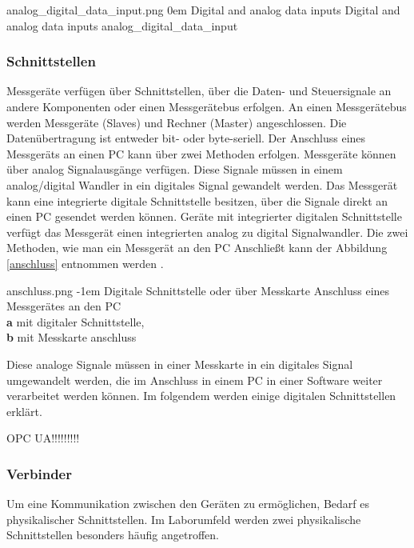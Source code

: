 {analog_digital_data_input.png}
{0em}
{Digital and analog data inputs \cite{hughes2010real}}
{Digital and analog data inputs \cite{hughes2010real}}
{analog_digital_data_input}



\subsubsection{Schnittstellen}

Messgeräte verfügen über Schnittstellen, über die Daten- und Steuersignale an andere Komponenten oder einen Messgerätebus erfolgen. An einen Messgerätebus werden Messgeräte (Slaves) und Rechner (Master) angeschlossen. Die Datenübertragung ist entweder bit- oder byte-seriell. Der Anschluss eines Messgeräts an einen PC kann über zwei Methoden erfolgen. Messgeräte können über analog Signalausgänge verfügen. Diese Signale müssen in einem analog/digital Wandler in ein digitales Signal gewandelt werden. Das Messgerät kann eine integrierte digitale Schnittstelle besitzen, über die Signale direkt an einen PC gesendet werden können. Geräte mit integrierter digitalen Schnittstelle verfügt das Messgerät einen integrierten analog zu digital Signalwandler.  Die zwei Methoden, wie man ein Messgerät an den PC Anschließt kann der Abbildung \ref{anschluss} entnommen werden \cite[S. 479]{Busch2015}.

{anschluss.png}
{-1em}
{Digitale Schnittstelle oder über Messkarte}
{Anschluss eines Messgerätes an den PC \cite[S. 479]{Busch2015} 	\\ \textbf{a} mit digitaler Schnittstelle,\\ \textbf{b} mit Messkarte }
{anschluss}

Diese analoge Signale müssen in einer Messkarte in ein digitales Signal umgewandelt werden, die im Anschluss in einem PC in einer Software weiter verarbeitet werden können. Im folgendem werden einige digitalen Schnittstellen erklärt.

OPC UA!!!!!!!!!



\subsubsection{Verbinder}

Um eine Kommunikation zwischen den Geräten zu ermöglichen, Bedarf es physikalischer Schnittstellen. Im Laborumfeld werden zwei physikalische Schnittstellen besonders häufig angetroffen. 

